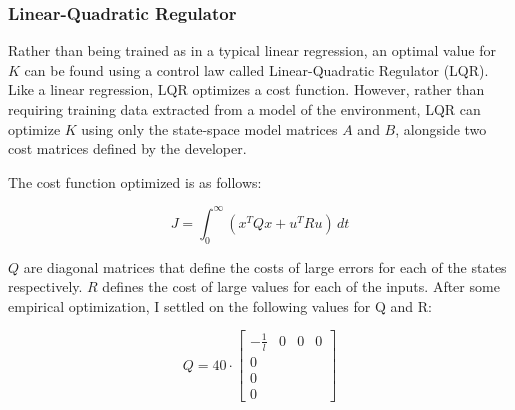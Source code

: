 \documentclass[12pt]{article}
\begin{document}
\subsubsection{Linear-Quadratic Regulator}

Rather than being trained as in a typical linear regression, an optimal value for $K$ can be found using a control law called Linear-Quadratic Regulator (LQR). Like a linear regression, LQR optimizes a cost function. However, rather than requiring training data extracted from a model of the environment, LQR can optimize $K$ using only the state-space model matrices $A$ and $B$, alongside two cost matrices defined by the developer.

The cost function optimized is as follows:

\begin{equation}
    J = \int _0 ^{\infty} \! (x ^T Q x + u ^T R u) \, dt
\end{equation}

$Q$ are diagonal matrices that define the costs of large errors for each of the states respectively. $R$ defines the cost of large values for each of the inputs. After some empirical optimization, I settled on the following values for Q and R:

\begin{equation}
    Q = 40 \cdot \begin{bmatrix}
        - \frac{1}{l} & 0 & 0 & 0 \\
        0 \\
        0 \\
        0
    \end{bmatrix}
\end{equation}

\printbibliography
\end{document}
